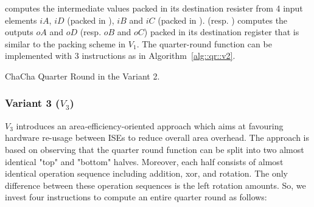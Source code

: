  computes the intermediate values packed in its destination resister  from 4 input elements $iA$, $iD$ (packed in ), $iB$ and $iC$ (packed in ).   (resp. ) computes the outputs $oA$ and $oD$ (resp. $oB$ and $oC$) packed in its destination register  that is similar to the packing scheme in $V_1$. 
The quarter-round function can be implemented with 3 instructions as in Algorithm~\ref{alg::qr::v2}.
\begin{algorithm}
\BlankLine
{}
\caption{ChaCha Quarter Round in the Variant 2.}
\label{alg::qr::v2}
\end{algorithm}

\subsubsection{Variant 3 ($V_3$)}
$V_3$ introduces an area-efficiency-oriented approach which aims at favouring hardware re-usage between ISEs to reduce overall area overhead. 
The approach is based on observing that the quarter round function can be split into two almost identical "top" and "bottom" halves. 
Moreover, each half consists of almost identical operation sequence including addition, xor, and rotation.
The only difference between these operation sequences is the left rotation amounts. 
So, we invest four instructions to compute an entire quarter round as follows:

